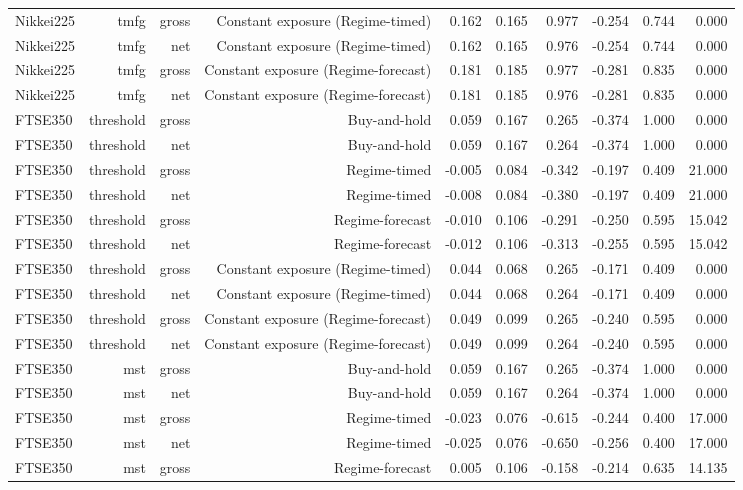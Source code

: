 \begin{tabular}{lrrrrrrrrr}
Nikkei225 & tmfg & gross & Constant exposure (Regime-timed) & 0.162 & 0.165 & 0.977 & -0.254 & 0.744 & 0.000 \\
Nikkei225 & tmfg & net & Constant exposure (Regime-timed) & 0.162 & 0.165 & 0.976 & -0.254 & 0.744 & 0.000 \\
Nikkei225 & tmfg & gross & Constant exposure (Regime-forecast) & 0.181 & 0.185 & 0.977 & -0.281 & 0.835 & 0.000 \\
Nikkei225 & tmfg & net & Constant exposure (Regime-forecast) & 0.181 & 0.185 & 0.976 & -0.281 & 0.835 & 0.000 \\
FTSE350 & threshold & gross & Buy-and-hold & 0.059 & 0.167 & 0.265 & -0.374 & 1.000 & 0.000 \\
FTSE350 & threshold & net & Buy-and-hold & 0.059 & 0.167 & 0.264 & -0.374 & 1.000 & 0.000 \\
FTSE350 & threshold & gross & Regime-timed & -0.005 & 0.084 & -0.342 & -0.197 & 0.409 & 21.000 \\
FTSE350 & threshold & net & Regime-timed & -0.008 & 0.084 & -0.380 & -0.197 & 0.409 & 21.000 \\
FTSE350 & threshold & gross & Regime-forecast & -0.010 & 0.106 & -0.291 & -0.250 & 0.595 & 15.042 \\
FTSE350 & threshold & net & Regime-forecast & -0.012 & 0.106 & -0.313 & -0.255 & 0.595 & 15.042 \\
FTSE350 & threshold & gross & Constant exposure (Regime-timed) & 0.044 & 0.068 & 0.265 & -0.171 & 0.409 & 0.000 \\
FTSE350 & threshold & net & Constant exposure (Regime-timed) & 0.044 & 0.068 & 0.264 & -0.171 & 0.409 & 0.000 \\
FTSE350 & threshold & gross & Constant exposure (Regime-forecast) & 0.049 & 0.099 & 0.265 & -0.240 & 0.595 & 0.000 \\
FTSE350 & threshold & net & Constant exposure (Regime-forecast) & 0.049 & 0.099 & 0.264 & -0.240 & 0.595 & 0.000 \\
FTSE350 & mst & gross & Buy-and-hold & 0.059 & 0.167 & 0.265 & -0.374 & 1.000 & 0.000 \\
FTSE350 & mst & net & Buy-and-hold & 0.059 & 0.167 & 0.264 & -0.374 & 1.000 & 0.000 \\
FTSE350 & mst & gross & Regime-timed & -0.023 & 0.076 & -0.615 & -0.244 & 0.400 & 17.000 \\
FTSE350 & mst & net & Regime-timed & -0.025 & 0.076 & -0.650 & -0.256 & 0.400 & 17.000 \\
FTSE350 & mst & gross & Regime-forecast & 0.005 & 0.106 & -0.158 & -0.214 & 0.635 & 14.135 \\

\end{tabular}
